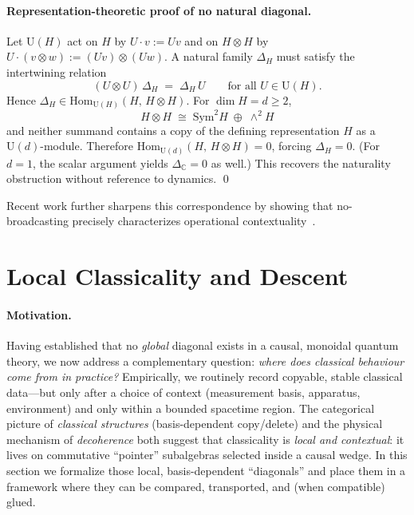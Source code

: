 \documentclass[11pt]{article}
\theoremstyle{upright}
\begin{document}
\paragraph{Representation-theoretic proof of no natural diagonal.}
Let $\mathrm{U}(H)$ act on $H$ by $U\cdot v := Uv$ and on $H\otimes H$ by $U\cdot (v\otimes w):=(Uv)\otimes (Uw)$. A natural family $\Delta_H$ must satisfy the intertwining relation
\begin{equation}
(U\otimes U)\,\Delta_H \;=\; \Delta_H\,U \qquad \text{for all } U\in \mathrm{U}(H).
\label{eq:intertwine}
\end{equation}
Hence $\Delta_H \in \mathrm{Hom}_{\mathrm{U}(H)}(H,\,H\otimes H)$. For $\dim H=d\ge 2$,
\[
H\otimes H \;\cong\; \mathrm{Sym}^2 H \;\oplus\; \wedge^2 H
\]
and neither summand contains a copy of the defining representation $H$ as a $\mathrm{U}(d)$-module. Therefore
\(
\mathrm{Hom}_{\mathrm{U}(d)}(H,\,H\otimes H)=0
\),
forcing $\Delta_H=0$. (For $d=1$, the scalar argument yields $\Delta_{\mathbb{C}}=0$ as well.) This recovers the naturality obstruction without reference to dynamics.
\qed

Recent work further sharpens this correspondence by showing that 
no-broadcasting precisely characterizes operational contextuality~\cite{Jokinen2024}.

\section{Local Classicality and Descent}
\label{sec:local-classicality-descent}

\paragraph{Motivation.}
Having established that no \emph{global} diagonal exists in a causal, monoidal quantum theory, we now address a complementary question: \emph{where does classical behaviour come from in practice?} Empirically, we routinely record copyable, stable classical data—but only after a choice of context (measurement basis, apparatus, environment) and only within a bounded spacetime region. The categorical picture of \emph{classical structures} (basis-dependent copy/delete) and the physical mechanism of \emph{decoherence} both suggest that classicality is \emph{local and contextual}: it lives on commutative ``pointer'' subalgebras selected inside a causal wedge. In this section we formalize those local, basis-dependent ``diagonals'' and place them in a framework where they can be compared, transported, and (when compatible) glued.
\end{document}
